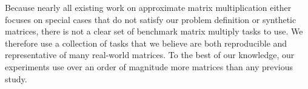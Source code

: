 
Because nearly all existing work on approximate matrix multiplication either focuses on special cases that do not satisfy our problem definition \cite{quickerAdc, pq, opq} or synthetic matrices, there is not a clear set of benchmark matrix multiply tasks to use. We therefore use a collection of tasks that we believe are both reproducible and representative of many real-world matrices. To the best of our knowledge, our experiments use over an order of magnitude more matrices than any previous study.

\vspace{-1mm}
